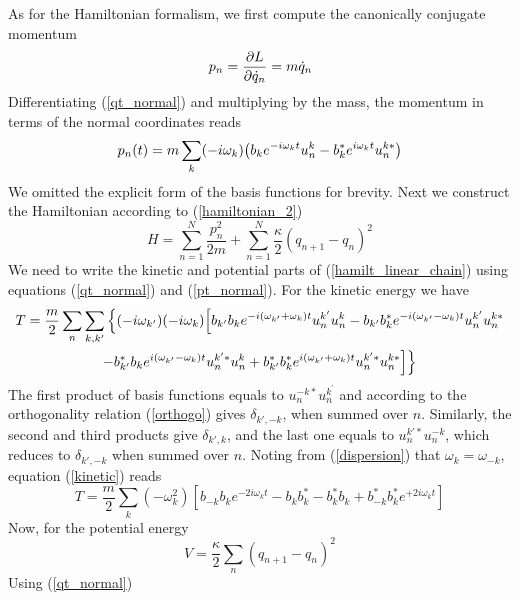 As for the Hamiltonian formalism, we first compute the canonically conjugate momentum
\begin{equation}
    p_n=\pdv{L}{\dot{q}_n}=m\dot{q}_n
\end{equation}
Differentiating (\ref{qt_normal}) and multiplying by the mass, the momentum in terms of the normal coordinates reads
\begin{equation}
    p_n(t)=m\sum_k(-{i}\omega_k)\qty(b_ke^{-{i}\omega_kt}u_n^k-b_k^*e^{{i}\omega_kt}u_n^{k*})
    \label{pt_normal}
\end{equation}
We omitted the explicit form of the basis functions for brevity. Next we construct the Hamiltonian according to (\ref{hamiltonian_2})
\begin{equation}
    H=\sum_{n=1}^N\frac{p_n^2}{2m}+\sum_{n=1}^N\frac{\kappa}{2}(q_{n+1}-q_{n})^2
    \label{hamilt_linear_chain}
\end{equation}
We need to write the kinetic and potential parts of (\ref{hamilt_linear_chain}) using equations (\ref{qt_normal}) and (\ref{pt_normal}). For the kinetic energy we have
\begin{multline}
T=\frac{m}{2}\sum_n\sum_{k,k'}\Big{\{}(-i\omega_{k^\prime})(-i\omega_k)\Big{[}b_{k'}b_k e^{-i(\omega_{k'}+\omega_k)t}u_n^{k'}u_n^{k}-b_{k'}b^*_ke^{-i(\omega_{k'}-\omega_k)t}u_n^{k'}u_n^{k*} \\ -b_{k'}^{*}b_ke^{i(\omega_{k'}-\omega_k)t}u_n^{k'*}u_n^{k}+b_{k'}^{*}b_k^*e^{i(\omega_{k'}+\omega_k)t}u_n^{k'*}u_n^{k*}\Big{]}\Big{\}}
\label{kinetic}
\end{multline}
The first product of basis functions equals to $u_n^{-k*}u_n^{k^\prime}$ and according to the orthogonality relation (\ref{orthogo}) gives $\delta_{k',-k}$, when summed over $n$. Similarly, the second and third products give $\delta_{k',k}$, and the last one equals to $u_n^{k'*}u_n^{-k}$, which reduces to $\delta_{k',-k}$ when summed over $n$. Noting from (\ref{dispersion}) that $\omega_k=\omega_{-k}$, equation (\ref{kinetic}) reads
\begin{equation}
    T=\frac{m}{2} \sum_{k}\left(-\omega_{k}^{2}\right)\left[b_{-k} b_{k} {e}^{-2 {i} \omega_{k} t}-b_{k} b_{k}^{*}-b_{k}^{*} b_{k}+b_{-k}^{*} b_{k}^{*} {e}^{+2 {i} \omega_{k} t}\right]
\end{equation}
Now, for the potential energy
\begin{equation}
V=\frac{\kappa}{2} \sum_{n}\left(q_{n+1}-q_{n}\right)^{2}
\end{equation}
Using (\ref{qt_normal})
